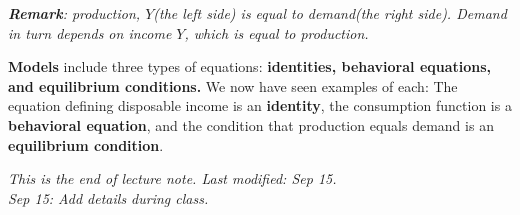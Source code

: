 \documentclass[11pt, a4paper]{ECON2123}
\begin{document}
\begin{spacing}{1.5}
    \textit{ \textbf{Remark}: production, $Y$(the left side) is equal to demand(the right
    side). Demand in turn depends on income $Y$, which is equal to production. }

    {\bf Models} include three types of equations: 
    {\bf identities, behavioral equations, and equilibrium conditions.} 
    We now have seen examples of each: The equation defining disposable income 
    is an {\bf identity}, the consumption function is a {\bf behavioral equation}, 
    and the condition that production equals demand is an {\bf equilibrium condition}.


    {\it This is the end of lecture note. Last modified: Sep 15.\\
    Sep 15: Add details during class.}

\end{spacing}
\end{document}
